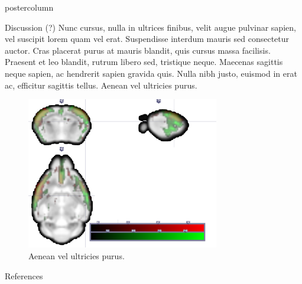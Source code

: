 \documentclass{beamer}
\begin{document}
\begin{frame}
\begin{columns}
\begin{column}{.57\textwidth}
\begin{beamercolorbox}[center]{postercolumn}
\begin{minipage}{.98\textwidth}
{					
					\begin{myblock}{Discussion (?)}
						Nunc cursus, nulla in ultrices finibus, velit augue pulvinar sapien, vel suscipit lorem quam vel erat. Suspendisse interdum mauris sed consectetur auctor. Cras placerat purus at mauris blandit, quis cursus massa facilisis. Praesent et leo blandit, rutrum libero sed, tristique neque. Maecenas sagittis neque sapien, ac hendrerit sapien gravida quis. Nulla nibh justo, euismod in erat ac, efficitur sagittis tellus. Aenean vel ultricies purus.
						\begin{figure}
							\begin{minipage}{0.85\textwidth}
								\centering\includegraphics[width=0.75\textwidth]{img/fail.png}
								\caption{Aenean vel ultricies purus.}
								\label{fig:fail}
							\end{minipage}
						\end{figure}
					\end{myblock}\vfill
					\begin{myblock}{References}
						\footnotesize
						
						
					\end{myblock}\vfill
		}\end{minipage}\end{beamercolorbox}
	\end{column}
\end{columns}
\end{frame}
\end{document}
